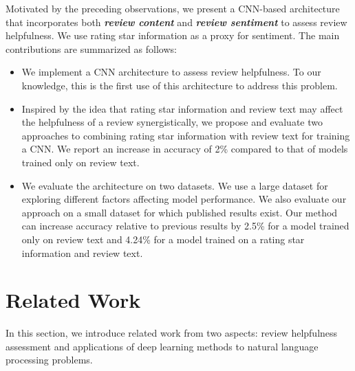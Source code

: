 \documentclass[conference,compsoc]{IEEEtran}
\begin{document}
Motivated by the preceding observations, we present a CNN-based architecture that incorporates both \textit{\textbf{review content}} and \textit{\textbf{review sentiment}} to assess review helpfulness. We use rating star information as a proxy for sentiment. The main contributions are summarized as follows:
\begin{itemize}

	\item We implement a CNN architecture to assess review helpfulness. To our knowledge, this is the first use of this architecture to address this problem.

	\item Inspired by the idea that rating star information and review text may affect the helpfulness of a review synergistically, we propose and evaluate two approaches to combining rating star information with review text for training a CNN. We report an increase in accuracy of 2\% compared to that of models trained only on review text.

	\item We evaluate the architecture on two datasets. We use a large dataset for exploring different factors affecting model performance. We also evaluate our approach on a small dataset for which published results exist. Our method can increase accuracy relative to previous results by 2.5\% for a model trained only on review text and 4.24\% for a model trained on a rating star information and review text.
\end{itemize}
\section{Related Work}\label{sec:related_work}
In this section, we introduce related work from two aspects: review helpfulness assessment and applications of deep learning methods to natural language processing problems.
\end{document}
